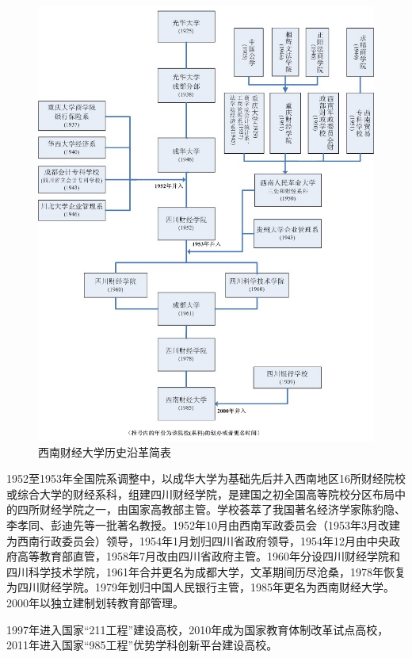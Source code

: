 \begin{figure}[htb]
\centering
\includegraphics[width=0.6\linewidth]{img/西南财经大学历史沿革简表.jpg}
\caption{西南财经大学历史沿革简表}
\label{fig:西南财经大学历史沿革简表}
\end{figure}

1952至1953年全国院系调整中，以成华大学为基础先后并入西南地区16所财经院校或综合大学的财经系科，组建四川财经学院，是建国之初全国高等院校分区布局中的四所财经学院之一，由国家高教部主管。学校荟萃了我国著名经济学家陈豹隐、李孝同、彭迪先等一批著名教授。1952年10月由西南军政委员会（1953年3月改建为西南行政委员会）领导，1954年1月划归四川省政府领导，1954年12月由中央政府高等教育部直管，1958年7月改由四川省政府主管。1960年分设四川财经学院和四川科学技术学院，1961年合并更名为成都大学，文革期间历尽沧桑，1978年恢复为四川财经学院。1979年划归中国人民银行主管，1985年更名为西南财经大学。2000年以独立建制划转教育部管理。

1997年进入国家“211工程”建设高校，2010年成为国家教育体制改革试点高校，2011年进入国家“985工程”优势学科创新平台建设高校。